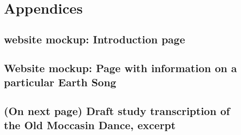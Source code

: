 \documentclass{neh}
\begin{document}
\section{Appendices}
\subsection{ website  mockup: Introduction page}

\clearpage
\subsection{Website  mockup: Page with information on a particular Earth Song}

\subsection{(On next page) Draft study transcription of the Old Moccasin
Dance, excerpt} 

\end{document}
